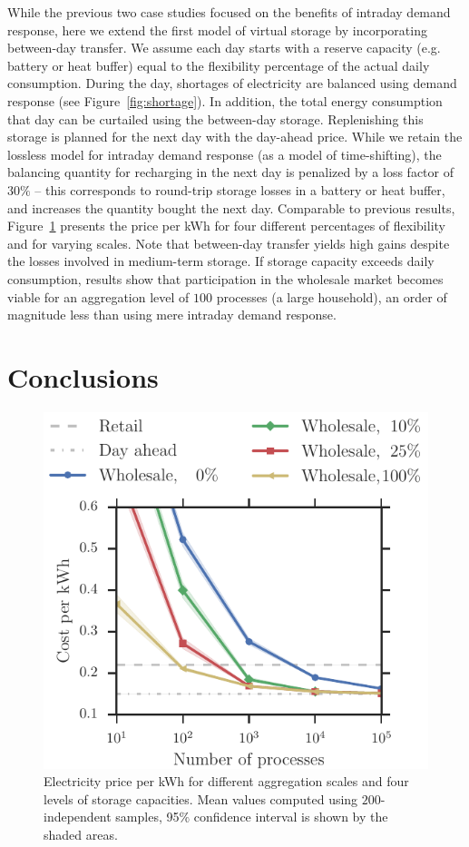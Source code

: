 \documentclass[conference]{IEEEtran}
\begin{document}
While the previous two case studies focused on the benefits of intraday demand response, here we extend the first model of virtual storage by incorporating between-day transfer. We assume each day starts with a reserve capacity (e.g. battery or heat buffer) equal to the flexibility percentage of the actual daily consumption. During the day, shortages of electricity are balanced using demand response (see Figure~\ref{fig:shortage}). In addition, the total energy consumption that day can be curtailed using the between-day storage. Replenishing this storage is planned for the next day with the day-ahead price. While we retain the lossless model for intraday demand response (as a model of time-shifting), the balancing quantity for recharging in the next day is penalized by a loss factor of $30\%$ -- this corresponds to round-trip storage losses in a battery or heat buffer, and increases the quantity bought the next day. Comparable to previous results, Figure~\ref{fig:Wholesale_betweenDay} presents the price per kWh for four different percentages of flexibility and for varying scales. Note that between-day transfer yields high gains despite the losses involved in medium-term storage. If storage capacity exceeds daily consumption, results show that participation in the wholesale market becomes viable for an aggregation level of $100$ processes (a large household), an order of magnitude less than using mere intraday demand response.


\section{Conclusions}
\label{sec:Conclusion}

\begin{figure}[!t]
\centering
\includegraphics[width=0.9\columnwidth]{figures/Wholesale_betweenDay.pdf}
\caption{Electricity price per kWh for different aggregation scales and four levels of storage capacities. Mean values computed using $200$-independent samples, 95$\%$ confidence interval is shown by the shaded areas.}
\label{fig:Wholesale_betweenDay}
\end{figure}
\end{document}
